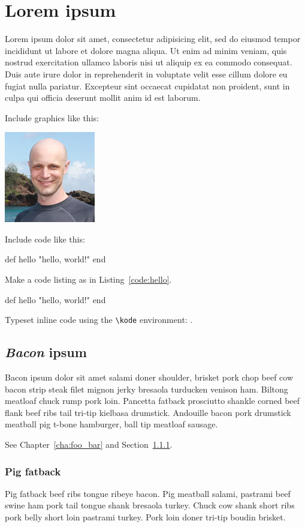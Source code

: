 \chapter{Lorem ipsum}
\label{cha:lorem_ipsum}

Lorem ipsum dolor sit amet, consectetur adipisicing elit, sed do eiusmod
tempor incididunt ut labore et dolore magna aliqua. Ut enim ad minim veniam,
quis nostrud exercitation ullamco laboris nisi ut aliquip ex ea commodo
consequat. Duis aute irure dolor in reprehenderit in voluptate velit esse
cillum dolore eu fugiat nulla pariatur. Excepteur sint occaecat cupidatat non
proident, sunt in culpa qui officia deserunt mollit anim id est laborum.

Include graphics like this:

\includegraphics{images/michael_hartl.png}

Include code like this:

\begin{code}
def hello
  "hello, world!"
end
\end{code}

Make a code listing as in Listing~\ref{code:hello}.

\begin{codelisting}
\label{code:hello}
\begin{code}
def hello
  "hello, world!"
end
\end{code}
\end{codelisting}

Typeset inline code using the \verb+\kode+ environment: .

\section{\emph{Bacon} ipsum}
\label{sec:bacon_ipsum}

Bacon ipsum dolor sit amet salami doner shoulder, brisket pork chop beef cow bacon strip steak filet mignon jerky bresaola turducken venison ham. Biltong meatloaf chuck rump pork loin. Pancetta fatback prosciutto shankle corned beef flank beef ribs tail tri-tip kielbasa drumstick. Andouille bacon pork drumstick meatball pig t-bone hamburger, ball tip meatloaf sausage.

See Chapter~\ref{cha:foo_bar} and Section~\ref{sec:pig_fatback}.

\subsection{Pig fatback}
\label{sec:pig_fatback}

Pig fatback beef ribs tongue ribeye bacon. Pig meatball salami, pastrami beef swine ham pork tail tongue shank bresaola turkey. Chuck cow shank short ribs pork belly short loin pastrami turkey. Pork loin doner tri-tip boudin brisket.
